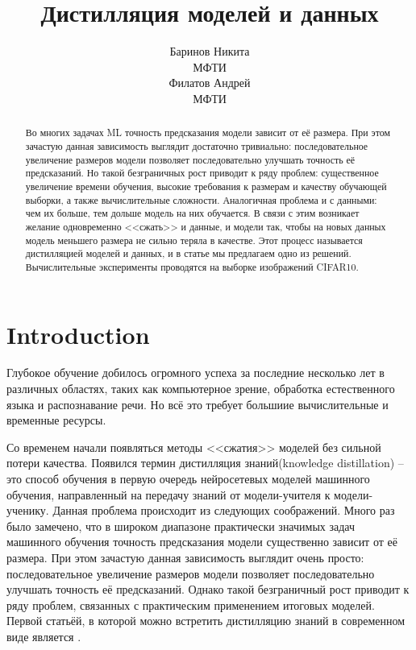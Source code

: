 \documentclass[12pt]{article}
\title{Дистилляция моделей и данных}
\author{ Баринов Никита\\
	МФТИ\\
	\And
	Филатов Андрей \\
	МФТИ       
}
\date{}
\begin{document}
\maketitle

\begin{abstract}


    Во многих задачах ML точность предсказания модели зависит от её размера. При этом зачастую данная зависимость выглядит достаточно тривиально: последовательное увеличение размеров модели позволяет последовательно улучшать точность её предсказаний. Но такой безграничных рост приводит к ряду проблем: существенное увеличение времени обучения, высокие требования к размерам и качеству обучающей выборки, а также вычислительные сложности. Аналогичная проблема и с данными: чем их больше, тем дольше модель на них обучается.
    В связи с этим возникает желание одновременно <<сжать>> и данные, и модели так, чтобы на новых данных модель меньшего размера не сильно теряла в качестве. Этот процесс называется дистилляцией моделей и данных, и в статье мы предлагаем одно из решений. Вычислительные эксперименты проводятся на выборке изображений CIFAR10. 


\end{abstract}



\section{Introduction}

Глубокое обучение добилось огромного успеха за последние несколько лет в различных областях, таких как компьютерное зрение, обработка естественного языка и распознавание речи. Но всё это требует большиие вычислительные и временные ресурсы.

Со временем начали появляться методы <<сжатия>> моделей без сильной потери качества. Появился термин дистилляция знаний(knowledge distillation) – это способ обучения в первую очередь нейросетевых моделей машинного обучения, направленный на передачу знаний от модели-учителя к модели-ученику. Данная проблема происходит из следующих соображений. Много раз было замечено, что в широком диапазоне практически значимых задач машинного обучения точность предсказания модели существенно зависит от её размера. При этом зачастую данная зависимость выглядит очень просто: последовательное увеличение размеров модели позволяет последовательно улучшать точность её предсказаний. Однако такой безграничный рост приводит к ряду проблем, связанных с практическим применением итоговых моделей. Первой статьёй, в которой можно встретить дистилляцию знаний в современном виде является \cite{hinton2015distilling}.
\end{document}
